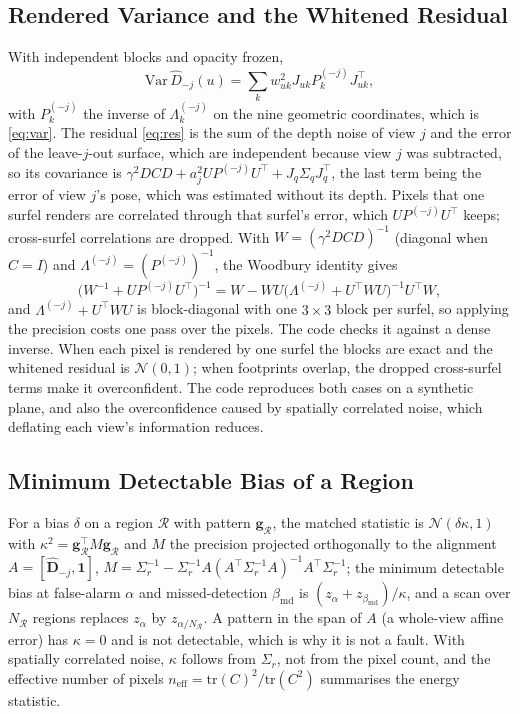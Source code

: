 \subsection{Rendered Variance and the Whitened Residual}
With independent blocks and opacity frozen,
\[
\mathrm{Var}\,\hat D_{-j}(u)=\sum_kw_{uk}^{2}J_{uk}P_k^{(-j)}J_{uk}^{\top},
\]
with $P_k^{(-j)}$ the inverse of $\Lambda_k^{(-j)}$ on the nine geometric coordinates, which is \eqref{eq:var}. The residual \eqref{eq:res} is the sum of the depth noise of view $j$ and the
error of the leave-$j$-out surface, which are independent because view $j$ was subtracted, so its
covariance is $\gamma^{2}DCD+a_j^{2}UP^{(-j)}U^{\top}+J_q\Sigma_qJ_q^{\top}$, the last term being the error of view
$j$'s pose, which was estimated without its depth. Pixels that one surfel renders are correlated through
that surfel's error, which $UP^{(-j)}U^{\top}$ keeps; cross-surfel correlations are dropped. With
$W=(\gamma^{2}DCD)^{-1}$ (diagonal when $C=I$) and $\Lambda^{(-j)}=(P^{(-j)})^{-1}$, the Woodbury identity
gives
\[
\bigl(W^{-1}+UP^{(-j)}U^{\top}\bigr)^{-1}=W-WU\bigl(\Lambda^{(-j)}+U^{\top}WU\bigr)^{-1}U^{\top}W,
\]
and $\Lambda^{(-j)}+U^{\top}WU$ is block-diagonal with one $3\times3$ block per surfel, so applying the
precision costs one pass over the pixels. The code checks it against a dense inverse. When each
pixel is rendered by one surfel the blocks are exact and the whitened residual is $\mathcal{N}(0,1)$;
when footprints overlap, the dropped cross-surfel terms make it overconfident. The code reproduces both
cases on a synthetic plane, and also the overconfidence caused by spatially correlated noise, which
deflating each view's information reduces.

\subsection{Minimum Detectable Bias of a Region}
For a bias $\delta$ on a region $\mathcal{R}$ with pattern $\mathbf{g}_{\mathcal{R}}$, the matched statistic is
$\mathcal{N}(\delta\kappa,1)$ with $\kappa^{2}=\mathbf{g}_{\mathcal{R}}^{\top}M\mathbf{g}_{\mathcal{R}}$ and $M$ the precision projected
orthogonally to the alignment $A=[\hat{\mathbf{D}}_{-j},\mathbf{1}]$,
$M=\Sigma_r^{-1}-\Sigma_r^{-1}A(A^{\top}\Sigma_r^{-1}A)^{-1}A^{\top}\Sigma_r^{-1}$; the minimum detectable bias at
false-alarm $\alpha$ and missed-detection $\beta_{\mathrm{md}}$ is
$(z_{\alpha}+z_{\beta_{\mathrm{md}}})/\kappa$, and a scan over $N_{\mathcal{R}}$ regions replaces $z_\alpha$ by
$z_{\alpha/N_{\mathcal{R}}}$. A pattern in the span of $A$ (a whole-view affine error) has $\kappa=0$ and is not
detectable, which is why it is not a fault. With spatially correlated noise, $\kappa$ follows from
$\Sigma_r$, not from the pixel count, and the effective number of pixels
$n_{\mathrm{eff}}=\mathrm{tr}(C)^{2}/\mathrm{tr}(C^{2})$ summarises the energy statistic.

